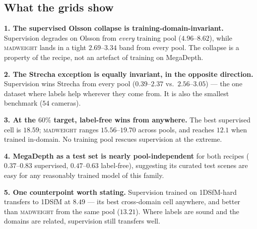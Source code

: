 \documentclass[11pt]{article}
\begin{document}
\subsection*{What the grids show}
\textbf{1. The supervised Olsson collapse is training-domain-invariant.} Supervision
degrades on Olsson from \emph{every} training pool ($4.96$--$8.62$), while
\textsc{madweight} lands in a tight $2.69$--$3.34$ band from every pool. The collapse is
a property of the recipe, not an artefact of training on MegaDepth.

\textbf{2. The Strecha exception is equally invariant, in the opposite direction.}
Supervision wins Strecha from every pool ($0.39$--$2.37$ vs.\ $2.56$--$3.05$) --- the one
dataset where labels help wherever they come from. It is also the smallest benchmark
($54$ cameras).

\textbf{3. At the $60\%$ target, label-free wins from anywhere.} The best supervised cell
is $18.59$; \textsc{madweight} ranges $15.56$--$19.70$ across pools, and reaches $12.1$
when trained in-domain. No training pool rescues supervision at the extreme.

\textbf{4. MegaDepth as a test set is nearly pool-independent} for both recipes
($0.37$--$0.83$ supervised, $0.47$--$0.63$ label-free), suggesting its curated test
scenes are easy for any reasonably trained model of this family.

\textbf{5. One counterpoint worth stating.} Supervision trained on 1DSfM-hard transfers
to 1DSfM at $8.49$ --- its best cross-domain cell anywhere, and better than
\textsc{madweight} from the same pool ($13.21$). Where labels are sound and the domains
are related, supervision still transfers well.
\end{document}
